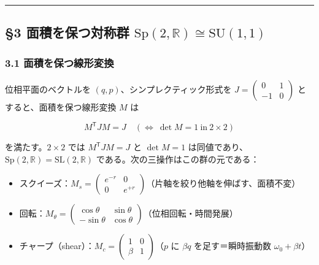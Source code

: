 \documentclass[
]{ltjsarticle}
\providecommand{\tightlist}{%
  \setlength{\itemsep}{0pt}\setlength{\parskip}{0pt}}
\begin{document}
\begin{center}\rule{0.5\linewidth}{0.5pt}\end{center}

\subsection{\texorpdfstring{§3 面積を保つ対称群
\(\mathrm{Sp}(2,\mathbb{R})\cong\mathrm{SU}(1,1)\)}{§3 面積を保つ対称群 \textbackslash mathrm\{Sp\}(2,\textbackslash mathbb\{R\})\textbackslash cong\textbackslash mathrm\{SU\}(1,1)}}\label{ux9762ux7a4dux3092ux4fddux3064ux5bfeux79f0ux7fa4-mathrmsp2mathbbrcongmathrmsu11}

\subsubsection{3.1
面積を保つ線形変換}\label{ux9762ux7a4dux3092ux4fddux3064ux7ddaux5f62ux5909ux63db}

位相平面のベクトルを \((q,p)\)、シンプレクティック形式を
\(J=\begin{pmatrix}0&1\\-1&0\end{pmatrix}\) とすると、面積を保つ線形変換
\(M\) は

\[M^{\mathsf T}JM=J\quad(\Longleftrightarrow\ \det M=1\ \text{in}\ 2\times2)\]

を満たす。\(2\times2\) では \(M^{\mathsf T}JM=J\) と \(\det M=1\)
は同値であり、\(\mathrm{Sp}(2,\mathbb{R})=\mathrm{SL}(2,\mathbb{R})\)
である。次の三操作はこの群の元である：

\begin{itemize}
\tightlist
\item
  スクイーズ：\(M_s=\begin{pmatrix}e^{-r}&0\\0&e^{+r}\end{pmatrix}\)（片軸を絞り他軸を伸ばす、面積不変）
\item
  回転：\(M_\theta=\begin{pmatrix}\cos\theta&\sin\theta\\-\sin\theta&\cos\theta\end{pmatrix}\)（位相回転・時間発展）
\item
  チャープ（shear）：\(M_c=\begin{pmatrix}1&0\\ \beta&1\end{pmatrix}\)（\(p\)
  に \(\beta q\) を足す＝瞬時振動数 \(\omega_0+\beta t\)）
\end{itemize}
\end{document}
